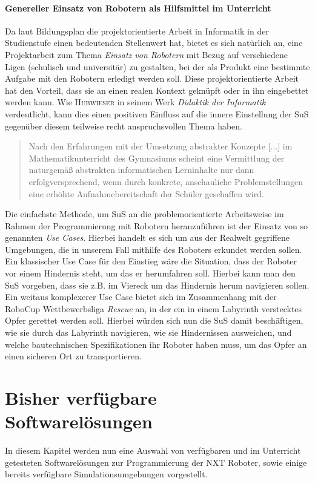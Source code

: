 \documentclass[paper=a4, pagesize, DIV=calc, BCOR=15.5mm, twoside=on, onecolumn=on, open = right, titlepage =on, parskip =half-, headsepline = on, footsepline = on, chapterprefix = on, appendixprefix = off, fontsize = 12pt, numbers = noenddot, abstract = on]{scrbook}
\numberwithin{equation}{chapter}
\theoremstyle{definition}
\theoremstyle{plain}
\theoremstyle{plain}
\theoremstyle{remark}
\theoremstyle{plain}
\theoremstyle{plain}
\begin{document}
\subsubsection{Genereller Einsatz von Robotern als Hilfsmittel im Unterricht}
Da laut Bildungsplan die projektorientierte Arbeit in Informatik in der Studienstufe einen bedeutenden Stellenwert hat, bietet es sich natürlich an, eine Projektarbeit zum Thema \emph{Einsatz von Robotern} mit Bezug auf verschiedene Ligen (schulisch und universitär) zu gestalten, bei der als Produkt eine bestimmte Aufgabe mit den Robotern erledigt werden soll.  Diese projektorientierte Arbeit hat den Vorteil, dass sie an einen realen Kontext geknüpft oder in ihn eingebettet werden kann. Wie \textsc{Hubwieser} in seinem Werk \emph{Didaktik der Informatik} verdeutlicht, kann dies einen positiven Einfluss auf die innere Einstellung der SuS gegenüber diesem teilweise recht anspruchsvollen Thema haben.
\begin{quote}
Nach den Erfahrungen mit der Umsetzung abstrakter Konzepte [...] im Mathematikunterricht des Gymnasiums scheint eine Vermittlung der naturgemäß abstrakten informatischen Lerninhalte nur dann erfolgversprechend, wenn durch konkrete, anschauliche Problemstellungen eine erhöhte Aufnahmebereitschaft der Schüler geschaffen wird. \cite[S.68]{hubwieser:07}
\end{quote}

Die einfachste Methode, um SuS an die problemorientierte Arbeitsweise im Rahmen der Programmierung mit Robotern heranzuführen ist der Einsatz von so genannten \emph{Use Cases}. Hierbei handelt es sich um aus der Realwelt gegriffene Umgebungen, die in unserem Fall mithilfe des Roboters erkundet werden sollen. Ein klassischer Use Case für den Einstieg wäre die Situation, dass der Roboter vor einem Hindernis steht, um das er herumfahren soll. Hierbei kann man den SuS vorgeben, dass sie z.B. im Viereck um das Hindernis herum navigieren sollen.\\
Ein weitaus komplexerer Use Case bietet sich im Zusammenhang mit der RoboCup Wettbewerbsliga \emph{Rescue} an, in der ein in einem Labyrinth verstecktes Opfer gerettet werden soll. Hierbei würden sich nun die SuS damit beschäftigen, wie sie durch das Labyrinth navigieren, wie sie Hindernissen ausweichen, und welche bautechnischen Spezifikationen ihr Roboter haben muss, um das Opfer an einen sicheren Ort zu transportieren.

\chapter{Bisher verfügbare Softwarelösungen}
\label{sec:software bisher}
In diesem Kapitel werden nun eine Auswahl von verfügbaren und im Unterricht getesteten Softwarelösungen zur Programmierung der NXT Roboter, sowie einige bereits verfügbare Simulationsumgebungen vorgestellt. 
\end{document}
